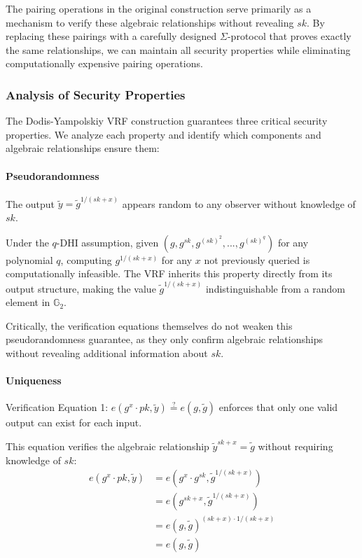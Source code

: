 The pairing operations in the original construction serve primarily as a mechanism to verify these algebraic relationships without revealing $sk$. By replacing these pairings with a carefully designed $\Sigma$-protocol that proves exactly the same relationships, we can maintain all security properties while eliminating computationally expensive pairing operations.



















\subsubsection{Analysis of Security Properties}
The Dodis-Yampolskiy VRF construction guarantees three critical security properties. We analyze each property and identify which components and algebraic relationships ensure them:

\paragraph{Pseudorandomness}
The output $\tilde{y} = \tilde{g}^{1/(sk + x)}$ appears random to any observer without knowledge of $sk$. 

Under the $q$-DHI assumption, given $(g, g^{sk}, g^{(sk)^2}, ..., g^{(sk)^q})$ for any polynomial $q$, computing $g^{1/(sk+x)}$ for any $x$ not previously queried is computationally infeasible. The VRF inherits this property directly from its output structure, making the value $\tilde{g}^{1/(sk+x)}$ indistinguishable from a random element in $\mathbb{G}_2$.

Critically, the verification equations themselves do not weaken this pseudorandomness guarantee, as they only confirm algebraic relationships without revealing additional information about $sk$.

\paragraph{Uniqueness}
Verification Equation 1: $e(g^{x} \cdot pk, \tilde{y}) \stackrel{?}{=} e(g, \tilde{g})$ enforces that only one valid output can exist for each input.

This equation verifies the algebraic relationship $\tilde{y}^{sk+x} = \tilde{g}$ without requiring knowledge of $sk$:
\begin{align*}
    e(g^{x} \cdot pk, \tilde{y}) &= e(g^{x} \cdot g^{sk}, \tilde{g}^{1/(sk + x)}) \\
    &= e(g^{sk + x}, \tilde{g}^{1/(sk + x)}) \\
    &= e(g, \tilde{g})^{(sk + x) \cdot 1/(sk + x)} \\
    &= e(g, \tilde{g})
\end{align*}

